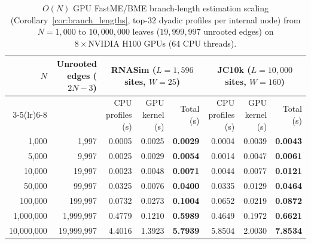 \begin{table}[!htbp]
\centering
\caption{$O(N)$ GPU FastME/BME branch-length estimation scaling (Corollary~\ref{cor:branch_lengths}, top-$32$ dyadic profiles per internal node) from $N=1{,}000$ to $10{,}000{,}000$ leaves ($19{,}999{,}997$ unrooted edges) on $8\times\text{NVIDIA H100}$ GPUs (64 CPU threads).}
\label{tab:bme_bl_scaling}
\scriptsize
\setlength{\tabcolsep}{4.5pt}
\begin{tabular*}{\linewidth}{@{\extracolsep{\fill}}rrrrrrrr@{}}
\toprule
$N$ & Unrooted edges ($2N-3$) & \multicolumn{3}{c}{\textbf{RNASim} ($L=1{,}596$ sites, $W=25$)} & \multicolumn{3}{c}{\textbf{JC10k} ($L=10{,}000$ sites, $W=160$)}\\
\cmidrule(lr){3-5}\cmidrule(lr){6-8}
 &  & CPU profiles (s) & GPU kernel (s) & Total (s) & CPU profiles (s) & GPU kernel (s) & Total (s)\\
\midrule
1,000 & 1,997 & 0.0005 & 0.0025 & \textbf{0.0029} & 0.0004 & 0.0039 & \textbf{0.0043}\\
5,000 & 9,997 & 0.0025 & 0.0029 & \textbf{0.0054} & 0.0014 & 0.0047 & \textbf{0.0061}\\
10,000 & 19,997 & 0.0023 & 0.0048 & \textbf{0.0071} & 0.0044 & 0.0077 & \textbf{0.0121}\\
50,000 & 99,997 & 0.0325 & 0.0076 & \textbf{0.0400} & 0.0335 & 0.0129 & \textbf{0.0464}\\
100,000 & 199,997 & 0.0732 & 0.0273 & \textbf{0.1004} & 0.0652 & 0.0219 & \textbf{0.0872}\\
1,000,000 & 1,999,997 & 0.4779 & 0.1210 & \textbf{0.5989} & 0.4649 & 0.1972 & \textbf{0.6621}\\
10,000,000 & 19,999,997 & 4.4016 & 1.3923 & \textbf{5.7939} & 5.8504 & 2.0030 & \textbf{7.8534}\\
\bottomrule
\end{tabular*}
\end{table}

